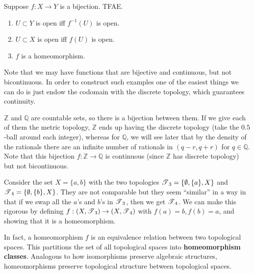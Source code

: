   \begin{theorem}
    Suppose $f: X \rightarrow Y$ is a bijection. TFAE. 
    \begin{enumerate}
      \item $U \subset Y$ is open iff $f^{-1} (U)$ is open. 
      \item $U \subset X$ is open iff $f(U)$ is open. 
      \item $f$ is a homeomorphism. 
    \end{enumerate}
  \end{theorem} 

  Note that we may have functions that are bijective and continuous, but not bicontinuous. In order to construct such examples one of the easiest things we can do is just endow the codomain with the discrete topology, which guarantees continuity. 

  \begin{example}
    $\mathbb{Z}$ and $\mathbb{Q}$ are countable sets, so there is a bijection between them. If we give each of them the metric topology, $\mathbb{Z}$ ends up having the discrete topology (take the $0.5$-ball around each integer), whereas for $\mathbb{Q}$, we will see later that by the density of the rationals there are an infinite number of rationals in $(q - r, q + r)$ for $q \in \mathbb{Q}$. Note that this bijection $f: \mathbb{Z} \rightarrow \mathbb{Q}$ is continuous (since $\mathbb{Z}$ has discrete topology) but not bicontinuous. 
  \end{example}


  \begin{example}
    Consider the set $X = \{a, b\}$ with the two topologies $\operatorname{\mathscr{T}}_3 = \{\emptyset, \{a\}, X\}$ and $\operatorname{\mathscr{T}}_4 = \{\emptyset, \{b\}, X\}$. They are not comparable but they seem ``similar'' in a way in that if we swap all the $a$'s and $b$'s in $\operatorname{\mathscr{T}}_3$, then we get $\operatorname{\mathscr{T}}_4$. We can make this rigorous by defining $f: (X, \operatorname{\mathscr{T}}_3) \rightarrow (X, \operatorname{\mathscr{T}}_4)$ with $f(a) = b, f(b) = a$, and showing that it is a homeomorphism. 
  \end{example}

  In fact, a homeomorphism $f$ is an equivalence relation between two topological spaces. This partitions the set of all topological spaces into \textbf{homeomorphism classes}. Analogous to how isomorphisms preserve algebraic structures, homeomorphisms preserve topological structure between topological spaces. 

